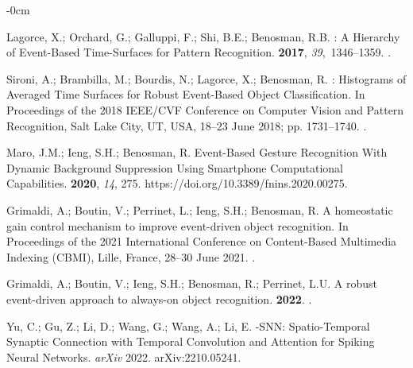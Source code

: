 \documentclass[brainsci, %
               review,accept,pdftex,moreauthors
               ]{Definitions/mdpi}
\begin{document}
\begin{adjustwidth}{-\extralength}{0cm}
\begin{thebibliography}{999}
Lagorce, X.; Orchard, G.; Galluppi, F.; Shi, B.E.; Benosman, R.B.
: {A} {Hierarchy} of {Event}-{Based} {Time}-{Surfaces} for
  {Pattern} {Recognition}.
  {\bf 2017}, {\em 39},~1346--1359.
.

Sironi, A.; Brambilla, M.; Bourdis, N.; Lagorce, X.; Benosman, R.
: {Histograms} of {Averaged} {Time} {Surfaces} for {Robust}
  {Event}-{Based} {Object} {Classification}.
\newblock In Proceedings of the 2018 {IEEE}/{CVF} {Conference} on {Computer}
  {Vision} and {Pattern} {Recognition}, Salt Lake City, UT, USA, {18--23 June} %
  2018;
  pp. 1731--1740.
.

Maro, J.M.; Ieng, S.H.; Benosman, R.
\newblock Event-{Based} {Gesture} {Recognition} {With} {Dynamic} {Background}
  {Suppression} {Using} {Smartphone} {Computational} {Capabilities}.
 {\bf 2020}, {\em 14}, 275.
  {{https://doi.org/10.3389/fnins.2020.00275}}.

Grimaldi, A.; Boutin, V.; Perrinet, L.; Ieng, S.H.; Benosman, R.
\newblock A homeostatic gain control mechanism to improve event-driven object
  recognition.
\newblock In Proceedings of the 2021 {International} {Conference} on
  {Content}-{Based} {Multimedia} {Indexing} ({CBMI}), {Lille, France,  28--30 June} %
  2021.
.

Grimaldi, A.; Boutin, V.; Ieng, S.H.; Benosman, R.; Perrinet, L.U.
\newblock A robust event-driven approach to always-on object recognition.
 {\bf 2022}.
.

Yu, C.; Gu, Z.; Li, D.; Wang, G.; Wang, A.; Li, E.
-{SNN}: {Spatio}-{Temporal} {Synaptic} {Connection} with
  {Temporal} {Convolution} and {Attention} for {Spiking} {Neural} {Networks}.  	\emph{arXiv}
  2022.
\newblock arXiv:2210.05241.


\end{thebibliography}
\end{adjustwidth}
\end{document}
